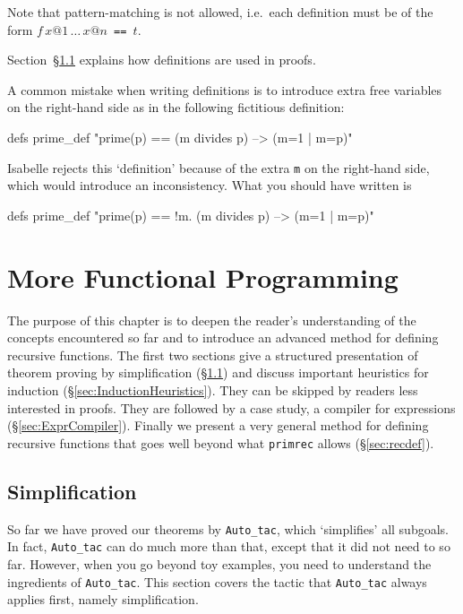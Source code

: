 Note that pattern-matching is not allowed, i.e.\ each definition must be of
the form $f\,x@1\,\dots\,x@n$\texttt{~==~}$t$.

Section~\S\ref{sec:Simplification} explains how definitions are used
in proofs.

\begin{warn}
A common mistake when writing definitions is to introduce extra free variables
on the right-hand side as in the following fictitious definition:
\begin{ttbox}
defs  prime_def "prime(p) == (m divides p) --> (m=1 | m=p)"
\end{ttbox}
Isabelle rejects this `definition' because of the extra {\tt m} on the
right-hand side, which would introduce an inconsistency.  What you should have
written is
\begin{ttbox}
defs  prime_def "prime(p) == !m. (m divides p) --> (m=1 | m=p)"
\end{ttbox}
\end{warn}




\chapter{More Functional Programming}

The purpose of this chapter is to deepen the reader's understanding of the
concepts encountered so far and to introduce an advanced method for defining
recursive functions. The first two sections give a structured presentation of
theorem proving by simplification (\S\ref{sec:Simplification}) and
discuss important heuristics for induction (\S\ref{sec:InductionHeuristics}). They
can be skipped by readers less interested in proofs. They are followed by a
case study, a compiler for expressions (\S\ref{sec:ExprCompiler}).
Finally we present a very general method for defining recursive functions
that goes well beyond what \texttt{primrec} allows (\S\ref{sec:recdef}).


\section{Simplification}
\label{sec:Simplification}

So far we have proved our theorems by \texttt{Auto_tac}, which
`simplifies' all subgoals. In fact, \texttt{Auto_tac} can do much more than
that, except that it did not need to so far. However, when you go beyond toy
examples, you need to understand the ingredients of \texttt{Auto_tac}.
This section covers the tactic that \texttt{Auto_tac} always applies first,
namely simplification.

